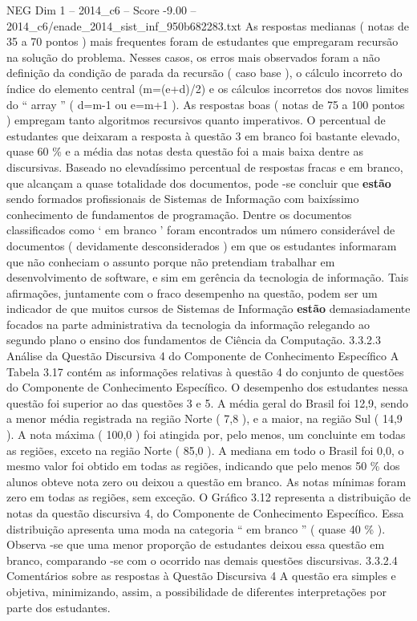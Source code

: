 \begin{textsample}{NEG Dim 1 – 2014\_c6 – Score -9.00 – 2014\_c6/enade\_2014\_sist\_inf\_950b682283.txt}
As respostas medianas ( notas de 35 a 70 pontos ) mais frequentes foram de estudantes que empregaram recursão na solução do problema.
Nesses casos, os erros mais observados foram a não definição da condição de parada da recursão ( caso base ), o cálculo incorreto do índice do elemento central (m=(e+d)/2) e os cálculos incorretos dos novos limites do “ array ” ( d=m-1 ou e=m+1 ).
As respostas boas ( notas de 75 a 100 pontos ) empregam tanto algoritmos recursivos quanto imperativos.
O percentual de estudantes que deixaram a resposta à questão 3 em branco foi bastante elevado, quase 60 \% e a média das notas desta questão foi a mais baixa dentre as discursivas.
Baseado no elevadíssimo percentual de respostas fracas e em branco, que alcançam a quase totalidade dos documentos, pode -se concluir que \textbf{estão} sendo formados profissionais de Sistemas de Informação com baixíssimo conhecimento de fundamentos de programação.
Dentre os documentos classificados como ‘ em branco ’ foram encontrados um número considerável de documentos ( devidamente desconsiderados ) em que os estudantes informaram que não conheciam o assunto porque não pretendiam trabalhar em desenvolvimento de software, e sim em gerência da tecnologia de informação.
Tais afirmações, juntamente com o fraco desempenho na questão, podem ser um indicador de que muitos cursos de Sistemas de Informação \textbf{estão} demasiadamente focados na parte administrativa da tecnologia da informação relegando ao segundo plano o ensino dos fundamentos de Ciência da Computação. 3.3.2.3 Análise da Questão Discursiva 4 do Componente de Conhecimento Específico A Tabela 3.17 contém as informações relativas à questão 4 do conjunto de questões do Componente de Conhecimento Específico.
O desempenho dos estudantes nessa questão foi superior ao das questões 3 e 5.
A média geral do Brasil foi 12,9, sendo a menor média registrada na região Norte ( 7,8 ), e a maior, na região Sul ( 14,9 ).
A nota máxima ( 100,0 ) foi atingida por, pelo menos, um concluinte em todas as regiões, exceto na região Norte ( 85,0 ).
A mediana em todo o Brasil foi 0,0, o mesmo valor foi obtido em todas as regiões, indicando que pelo menos 50 \% dos alunos obteve nota zero ou deixou a questão em branco.
As notas mínimas foram zero em todas as regiões, sem exceção.
O Gráfico 3.12 representa a distribuição de notas da questão discursiva 4, do Componente de Conhecimento Específico.
Essa distribuição apresenta uma moda na categoria “ em branco ” ( quase 40 \% ).
Observa -se que uma menor proporção de estudantes deixou essa questão em branco, comparando -se com o ocorrido nas demais questões discursivas. 3.3.2.4 Comentários sobre as respostas à Questão Discursiva 4 A questão era simples e objetiva, minimizando, assim, a possibilidade de diferentes interpretações por parte dos estudantes.

\end{textsample}
